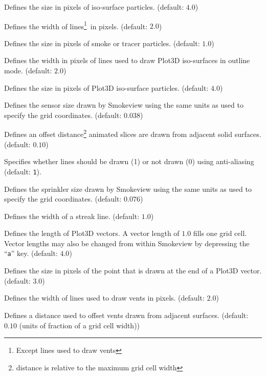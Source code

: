 \documentclass[11pt,twoside]{book}
\begin{document}
Defines the size in pixels
of iso-surface particles.
(default: $4.0$)

Defines the width of
lines\footnote{Except lines used to draw vents}\ in pixels.
(default: $2.0$)

Defines the size in pixels
of smoke or tracer particles.
(default: $1.0$)

Defines the width in pixels
of lines used to draw Plot3D iso-surfaces in outline mode.
(default: $2.0$)

Defines the size in pixels
of Plot3D iso-surface particles.
(default: $4.0$)

Defines the sensor size drawn
by Smokeview using the same units as used to specify the grid coordinates.
(default: $0.038$)


Defines an offset
distance\footnote{distance is relative to the maximum grid cell width}
animated slices are drawn from adjacent solid surfaces.
(default: $0.10$)

Specifies whether lines should be drawn (1) or not drawn (0) using
anti-aliasing  (default: {\tt 1}).


Defines the sprinkler size drawn
by Smokeview using the same units as used to specify the grid coordinates.
(default: $0.076$)

Defines the width of a streak line.
(default: $1.0$)


Defines the length of Plot3D vectors. A vector
length of $1.0$ fills one grid cell.  Vector lengths may also be
changed from within Smokeview by depressing the ``{\tt a}'' key.
(default: $4.0$)


Defines the size in pixels of the point
that is drawn at the end of a Plot3D vector. (default: $3.0$)

Defines the width of
lines used to draw vents in pixels.
(default: $2.0$)

Defines a distance used to offset
vents drawn from adjacent surfaces.
(default: $0.10$ (units of fraction of a grid cell width))
\end{document}
